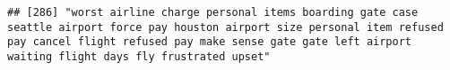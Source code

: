 \documentclass[
]{article}
\begin{document}
\begin{verbatim}
## [286] "worst airline charge personal items boarding gate case seattle airport force pay houston airport size personal item refused pay cancel flight refused pay make sense gate gate left airport waiting flight days fly frustrated upset"                                                                                                                                                                                                                                                                                                                                                                                                                                                                                                                                                                                                                                                                                                                                                                                                                                                                                                                                                                                                                                                                                                                                                                                                                                                                                                                                                                                                                                                                                                                                                          

\end{verbatim}
\end{document}
